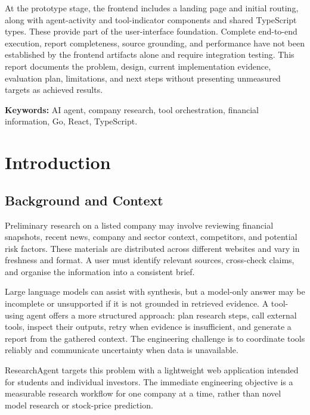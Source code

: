 \documentclass[12pt,a4paper,oneside]{report}
\begin{document}
At the prototype stage, the frontend includes a landing page and initial routing, along with agent-activity and tool-indicator components and shared TypeScript types. These provide part of the user-interface foundation. Complete end-to-end execution, report completeness, source grounding, and performance have not been established by the frontend artifacts alone and require integration testing. This report documents the problem, design, current implementation evidence, evaluation plan, limitations, and next steps without presenting unmeasured targets as achieved results.

\noindent\textbf{Keywords:} AI agent, company research, tool orchestration, financial information, Go, React, TypeScript.

\tableofcontents
\listoffigures
\listoftables
\clearpage
{}

\chapter{Introduction}
\section{Background and Context}
Preliminary research on a listed company may involve reviewing financial snapshots, recent news, company and sector context, competitors, and potential risk factors. These materials are distributed across different websites and vary in freshness and format. A user must identify relevant sources, cross-check claims, and organise the information into a consistent brief.

Large language models can assist with synthesis, but a model-only answer may be incomplete or unsupported if it is not grounded in retrieved evidence. A tool-using agent offers a more structured approach: plan research steps, call external tools, inspect their outputs, retry when evidence is insufficient, and generate a report from the gathered context. The engineering challenge is to coordinate tools reliably and communicate uncertainty when data is unavailable.

ResearchAgent targets this problem with a lightweight web application intended for students and individual investors. The immediate engineering objective is a measurable research workflow for one company at a time, rather than novel model research or stock-price prediction.
\end{document}
